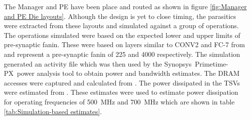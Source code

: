 \documentclass[journal]{IEEEtran}
\begin{document}
The Manager and PE have been place and routed as shown in figure \ref{fig:Manager and PE Die layouts}. 
Although the design is yet to close timing, the parasitics were extracted from these layouts and simulated against a group of operations. The operations simulated were based on the expected lower and upper limits of pre-synaptic fanin. These were based on layers similar to CONV2 and FC-7 from \cite{krizhevsky2012imagenet} and represent a pre-synaptic fanin of 225 and 4000 respectively.
The simulation generated an activity file which was then used by the Synopsys\textregistered ~Primetime-PX\texttrademark ~power analysis tool to obtain power and bandwidth estimates.
The DRAM accesses were captured and calculated from \cite{tezzaron:diram4}. The power dissipated in the TSVs were estimated from \cite{liu2012compact}.
These estimates were used to estimate power dissipation for operating frequencies of \SI{500}{\mega\hertz} and \SI{700}{\mega\hertz} which are shown in table \ref{tab:Simulation-based estimates}.
\end{document}
